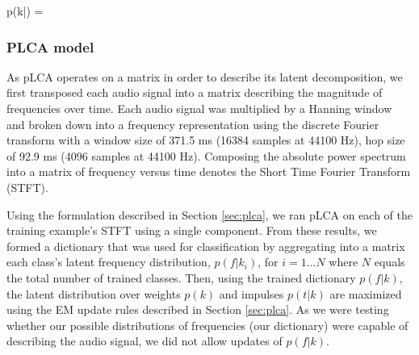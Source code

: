 \documentclass[a4paper,10pt,final]{ThesisStyle}
\begin{document}
\begin{equationb}
p(k|) =   
\end{equationb}

\subsubsection{PLCA model}

As pLCA operates on a matrix in order to describe its latent decomposition, we first transposed each audio signal into a matrix describing the magnitude of frequencies over time.  Each audio signal was multiplied by a Hanning window and broken down into a frequency representation using the discrete Fourier transform with a window size of 371.5 ms (16384 samples at 44100 Hz), hop size of 92.9 ms (4096 samples at 44100 Hz).  Composing the absolute power spectrum into a matrix of frequency versus time denotes the Short Time Fourier Transform (STFT).

Using the formulation described in Section \ref{sec:plca}, we ran pLCA on each of the training example's STFT using a single component.  From these results, we formed a dictionary that was used for classification by aggregating into a matrix each class's latent frequency distribution, $p(f|k_i)$, for $i = {1...N}$ where $N$ equals the total number of trained classes.  Then, using the trained dictionary $p(f|k)$, the latent distribution over weights $p(k)$ and impulses $p(t|k)$ are maximized using the EM update rules described in Section \ref{sec:plca}.  As we were testing whether our possible distributions of frequencies (our dictionary) were capable of describing the audio signal, we did not allow updates of $p(f|k)$.

\end{document}
